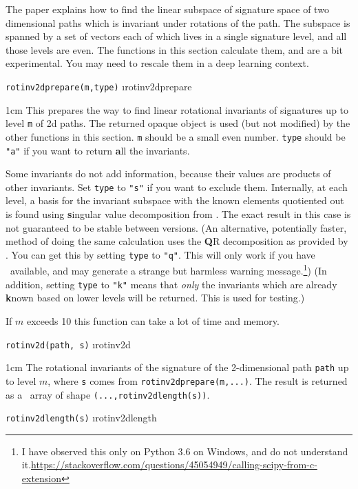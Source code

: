 \documentclass[a4paper]{extarticle}
\newenvironment{defn}{\begin{adjustwidth}{1cm}{}\ignorespaces}{\end{adjustwidth}\ignorespacesafterend}
\begin{document}
The paper \cite{JD} explains how to find the linear subspace of signature space of two dimensional paths which is invariant under rotations of the path. The subspace is spanned by a set of vectors each of which lives in a single signature level, and all those levels are even. The functions in this section calculate them, and are a bit experimental. You may need to rescale them in a deep learning context. 

\verb!rotinv2dprepare(m,type)! \i{rotinv2dprepare}
\begin{defn}
	\nopagebreak This prepares the way to find linear rotational invariants of signatures up to level \verb|m| of 2d paths. The returned opaque object is used (but not modified) by the other functions in this section. \verb|m| should be a small even number. \verb|type| should be \verb|"a"| if you want to return \textbf{a}ll the invariants.
	
	Some invariants do not add information, because their values are products of other invariants. Set \verb|type| to \verb|"s"| if you want to exclude them. Internally, at each level, a basis for the invariant subspace with the known elements quotiented out is found using \textbf{s}ingular value decomposition from \numpy. The exact result in this case is not guaranteed to be stable between versions. (An alternative, potentially faster, method of doing the same calculation uses the \textbf{Q}R decomposition as provided by \scipy. You can get this by setting \verb|type| to \verb|"q"|. This will only work if you have \scipy\ available, and may generate a strange but harmless warning message.\footnote{I have observed this only on Python 3.6 on Windows, and do not understand it.\url{https://stackoverflow.com/questions/45054949/calling-scipy-from-c-extension}}) (In addition, setting \verb|type| to \verb|"k"| means that \emph{only} the invariants which are already \textbf{k}nown based on lower levels will be returned. This is used for testing.)
	
	If $m$ exceeds 10 this function can take a lot of time and memory.
\end{defn}
\verb!rotinv2d(path, s)! \i{rotinv2d}

\begin{defn}
	\nopagebreak The rotational invariants of the signature of the 2-dimensional path \verb|path| up to level $m$, where \verb!s! comes from \verb!rotinv2dprepare(m,...)!. The result is returned as a \numpy\ array of shape \verb!(...,rotinv2dlength(s))!.
\end{defn}
\verb!rotinv2dlength(s)! \i{rotinv2dlength}
\end{document}
